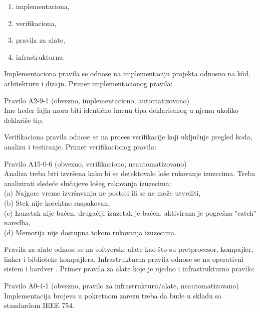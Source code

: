\documentclass[12pt,oneside]{memoir}
\begin{document}
\begin{enumerate}
  \item{implementaciona},
  \item{verifikaciona},
  \item{pravila za alate},
  \item{infrastrukturna}.
\end{enumerate}

Implementaciona pravila se odnose na implementaciju projekta odnosno na k\^{o}d, arhitekturu i dizajn.
Primer implementacionog pravila:

\begin{center}
\begin{tcolorbox}
Pravilo A2-9-1 (obvezno, implementaciono, automatizovano) \\
Ime heder fajla mora biti identično imenu tipa deklarisanog u njemu ukoliko deklariše tip.
\end{tcolorbox}
\end{center}


Verifikaciona pravila odnose se na proces verifikacije koji uključuje pregled koda, analizu i testiranje.
Primer verifikacionog pravila:

\begin{center}
\begin{tcolorbox}
Pravilo A15-0-6 (obvezno, verifikaciono, neautomatizovano) \\
Analiza treba biti izvršena kako bi se detektovalo loše rukovanje izuzecima. Treba analizirati slede\'ce slučajeve lošeg rukovanja izuzecima: \\
(a) Najgore vreme izvršavanja ne postoji ili se ne može utvrditi, \\
(b) Stek nije korektno raspakovan, \\
(c) Izuzetak nije bačen, drugačiji izuzetak je bačen, aktivirana je pogre\v{s}na "catch" naredba, \\
(d) Memorija nije dostupna tokom rukovanja izuzecima.
\end{tcolorbox}
\end{center}

Pravila za alate odnose se na softverske alate kao što su pretprocesor, kompajler, linker i biblioteke kompajlera.
Infrastrukturna pravila odnose se na operativni sistem i hardver \cite{AutosarGuidelines}.
Primer pravila za alate koje je ujedno i infrastrukturno pravilo:

\begin{center}
\begin{tcolorbox}
Pravilo A0-4-1 (obvezno, pravilo za infrastrukturu/alate, neautomatizovano) \\
Implementacija brojeva u pokretnom zarezu treba da bude u skladu sa standardom IEEE 754.
\end{tcolorbox}
\end{center}
\end{document}
